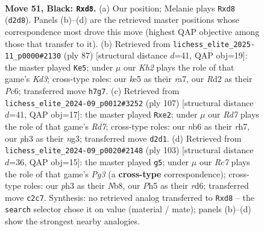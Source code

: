 \documentclass[11pt]{article}
\begin{document}
\clearpage

\begin{figure}[p]\centering
\begin{subfigure}{0.46\textwidth}\centering
\resizebox{\linewidth}{!}{%
\newchessgame
\chessboard[
  setfen={3R4/1p5k/1N4pb/4Kp1p/P7/6PP/2rr4/8 b - - 5 51},
  showmover=false,
  pgfstyle=straightmove, color=movearrow, markmove={d2-d8}
]}
\caption{}
\end{subfigure}\hfill
\begin{subfigure}{0.46\textwidth}\centering
\resizebox{\linewidth}{!}{%
\newchessgame
\chessboard[
  setfen={8/R7/2pkb1P1/pp6/2r1B3/P3K3/1P6/8 b - - 6 44},
  showmover=false,
  pgfstyle=straightmove, color=movearrow, markmove={d6-e5}
]}
\caption{}
\end{subfigure}
\\[4pt]
\begin{subfigure}{0.46\textwidth}\centering
\resizebox{\linewidth}{!}{%
\newchessgame
\chessboard[
  setfen={3r4/2p4R/1k2p3/2b2pK1/5P2/6N1/3rB1P1/8 b - - 16 54},
  showmover=false,
  pgfstyle=straightmove, color=movearrow, markmove={d2-e2}
]}
\caption{}
\end{subfigure}\hfill
\begin{subfigure}{0.46\textwidth}\centering
\resizebox{\linewidth}{!}{%
\newchessgame
\chessboard[
  setfen={1n6/8/3R2p1/5p2/p1P2P1p/P3N1rk/1P2K3/8 b - - 7 52},
  showmover=false,
  pgfstyle=straightmove, color=movearrow, markmove={g6-g5}
]}
\caption{}
\end{subfigure}
\caption{\textbf{Move 51, Black: \texttt{Rxd8}.} (a) Our position; Melanie plays \texttt{Rxd8} (\texttt{d2d8}). Panels (b)--(d) are the retrieved master positions whose correspondence most drove this move (highest QAP objective among those that transfer to it). (b) Retrieved from \texttt{lichess\_elite\_2025-11\_p0000\#2130} (ply 87) [structural distance $d$=41, QAP obj=19]: the master played \texttt{Ke5}; under $\mu$ our \emph{Kh2} plays the role of that game's \emph{Kd3}; cross-type roles: our \emph{k}e5 as their \emph{r}a7, our \emph{R}d2 as their \emph{P}c6; transferred move \texttt{h7g7}. (c) Retrieved from \texttt{lichess\_elite\_2024-09\_p0012\#3252} (ply 107) [structural distance $d$=41, QAP obj=17]: the master played \texttt{Rxe2}; under $\mu$ our \emph{Rd7} plays the role of that game's \emph{Rd7}; cross-type roles: our \emph{n}b6 as their \emph{r}h7, our \emph{p}h3 as their \emph{n}g3; transferred move \texttt{d2d1}. (d) Retrieved from \texttt{lichess\_elite\_2024-09\_p0020\#2148} (ply 103) [structural distance $d$=36, QAP obj=15]: the master played \texttt{g5}; under $\mu$ our \emph{Rc7} plays the role of that game's \emph{Pg3} (a \textbf{cross-type} correspondence); cross-type roles: our \emph{p}h3 as their \emph{N}b8, our \emph{P}h5 as their \emph{r}d6; transferred move \texttt{c2c7}. Synthesis: no retrieved analog transferred to \texttt{Rxd8} -- the \texttt{search} selector chose it on value (material / mate); panels (b)--(d) show the strongest nearby analogies.}
\label{fig:thought-m101}
\end{figure}
\end{document}
